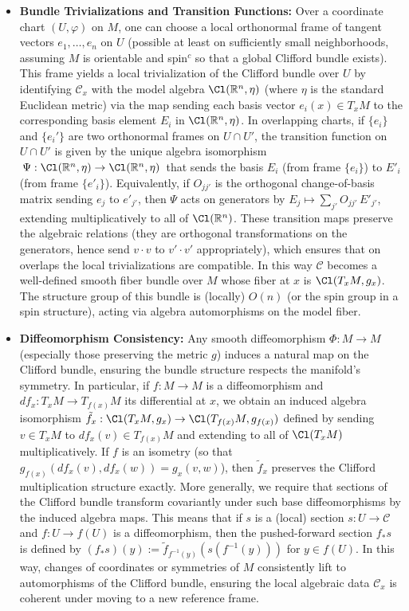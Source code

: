 \documentclass[12pt]{article}
\begin{document}
\begin{itemize}
    \item \textbf{Bundle Trivializations and Transition Functions:} Over a coordinate chart $(U, \varphi)$ on $M$, one can choose a local orthonormal frame of tangent vectors $e_1,\dots,e_n$ on $U$ (possible at least on sufficiently small neighborhoods, assuming $M$ is orientable and spin$^c$ so that a global Clifford bundle exists). This frame yields a local trivialization of the Clifford bundle over $U$ by identifying $\mathcal{C}_x$ with the model algebra $\Cl(\mathbb{R}^n, \eta)$ (where $\eta$ is the standard Euclidean metric) via the map sending each basis vector $e_i(x)\in T_x M$ to the corresponding basis element $E_i$ in $\Cl(\mathbb{R}^n,\eta)$. In overlapping charts, if $\{e_i\}$ and $\{e_i'\}$ are two orthonormal frames on $U \cap U'$, the transition function on $U \cap U'$ is given by the unique algebra isomorphism $\,\Psi: \Cl(\mathbb{R}^n,\eta) \to \Cl(\mathbb{R}^n,\eta)\,$ that sends the basis $E_i$ (from frame $\{e_i\}$) to $E'_i$ (from frame $\{e'_i\}$). Equivalently, if $O_{jj'}$ is the orthogonal change-of-basis matrix sending $e_j$ to $e'_{j'}$, then $\Psi$ acts on generators by $E_j \mapsto \sum_{j'} O_{jj'}\, E'_{j'}$, extending multiplicatively to all of $\Cl(\mathbb{R}^n)$. These transition maps preserve the algebraic relations (they are orthogonal transformations on the generators, hence send $v\cdot v$ to $v'\cdot v'$ appropriately), which ensures that on overlaps the local trivializations are compatible. In this way $\mathcal{C}$ becomes a well-defined smooth fiber bundle over $M$ whose fiber at $x$ is $\Cl(T_x M, g_x)$. The structure group of this bundle is (locally) $O(n)$ (or the spin group in a spin structure), acting via algebra automorphisms on the model fiber.

    \item \textbf{Diffeomorphism Consistency:} Any smooth diffeomorphism $\Phi: M \to M$ (especially those preserving the metric $g$) induces a natural map on the Clifford bundle, ensuring the bundle structure respects the manifold's symmetry. In particular, if $f: M \to M$ is a diffeomorphism and $df_x: T_x M \to T_{f(x)}M$ its differential at $x$, we obtain an induced algebra isomorphism $\tilde{f}_x: \Cl(T_x M, g_x) \to \Cl(T_{f(x)}M, g_{f(x)})$ defined by sending $v \in T_x M$ to $df_x(v) \in T_{f(x)}M$ and extending to all of $\Cl(T_x M)$ multiplicatively. If $f$ is an isometry (so that $g_{f(x)}(df_x(v), df_x(w)) = g_x(v,w)$), then $\tilde{f}_x$ preserves the Clifford multiplication structure exactly. More generally, we require that sections of the Clifford bundle transform covariantly under such base diffeomorphisms by the induced algebra maps. This means that if $s$ is a (local) section $s: U \to \mathcal{C}$ and $f: U \to f(U)$ is a diffeomorphism, then the pushed-forward section $f_* s$ is defined by $(f_* s)(y) := \tilde{f}_{f^{-1}(y)}(s(f^{-1}(y)))$ for $y \in f(U)$. In this way, changes of coordinates or symmetries of $M$ consistently lift to automorphisms of the Clifford bundle, ensuring the local algebraic data $\mathcal{C}_x$ is coherent under moving to a new reference frame.
\end{itemize}
\end{document}
